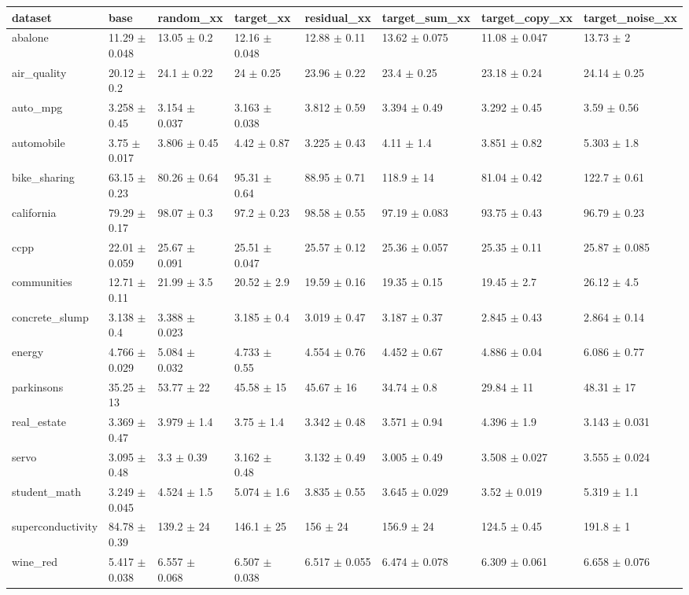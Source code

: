 \begin{tabular}{llllllll}
\toprule
dataset & base & random\_xx & target\_xx & residual\_xx & target\_sum\_xx & target\_copy\_xx & target\_noise\_xx \\
\midrule
abalone & 11.29 $\pm$ 0.048 & 13.05 $\pm$ 0.2 & 12.16 $\pm$ 0.048 & 12.88 $\pm$ 0.11 & 13.62 $\pm$ 0.075 & 11.08 $\pm$ 0.047 & 13.73 $\pm$ 2 \\
air\_quality & 20.12 $\pm$ 0.2 & 24.1 $\pm$ 0.22 & 24 $\pm$ 0.25 & 23.96 $\pm$ 0.22 & 23.4 $\pm$ 0.25 & 23.18 $\pm$ 0.24 & 24.14 $\pm$ 0.25 \\
auto\_mpg & 3.258 $\pm$ 0.45 & 3.154 $\pm$ 0.037 & 3.163 $\pm$ 0.038 & 3.812 $\pm$ 0.59 & 3.394 $\pm$ 0.49 & 3.292 $\pm$ 0.45 & 3.59 $\pm$ 0.56 \\
automobile & 3.75 $\pm$ 0.017 & 3.806 $\pm$ 0.45 & 4.42 $\pm$ 0.87 & 3.225 $\pm$ 0.43 & 4.11 $\pm$ 1.4 & 3.851 $\pm$ 0.82 & 5.303 $\pm$ 1.8 \\
bike\_sharing & 63.15 $\pm$ 0.23 & 80.26 $\pm$ 0.64 & 95.31 $\pm$ 0.64 & 88.95 $\pm$ 0.71 & 118.9 $\pm$ 14 & 81.04 $\pm$ 0.42 & 122.7 $\pm$ 0.61 \\
california & 79.29 $\pm$ 0.17 & 98.07 $\pm$ 0.3 & 97.2 $\pm$ 0.23 & 98.58 $\pm$ 0.55 & 97.19 $\pm$ 0.083 & 93.75 $\pm$ 0.43 & 96.79 $\pm$ 0.23 \\
ccpp & 22.01 $\pm$ 0.059 & 25.67 $\pm$ 0.091 & 25.51 $\pm$ 0.047 & 25.57 $\pm$ 0.12 & 25.36 $\pm$ 0.057 & 25.35 $\pm$ 0.11 & 25.87 $\pm$ 0.085 \\
communities & 12.71 $\pm$ 0.11 & 21.99 $\pm$ 3.5 & 20.52 $\pm$ 2.9 & 19.59 $\pm$ 0.16 & 19.35 $\pm$ 0.15 & 19.45 $\pm$ 2.7 & 26.12 $\pm$ 4.5 \\
concrete\_slump & 3.138 $\pm$ 0.4 & 3.388 $\pm$ 0.023 & 3.185 $\pm$ 0.4 & 3.019 $\pm$ 0.47 & 3.187 $\pm$ 0.37 & 2.845 $\pm$ 0.43 & 2.864 $\pm$ 0.14 \\
energy & 4.766 $\pm$ 0.029 & 5.084 $\pm$ 0.032 & 4.733 $\pm$ 0.55 & 4.554 $\pm$ 0.76 & 4.452 $\pm$ 0.67 & 4.886 $\pm$ 0.04 & 6.086 $\pm$ 0.77 \\
parkinsons & 35.25 $\pm$ 13 & 53.77 $\pm$ 22 & 45.58 $\pm$ 15 & 45.67 $\pm$ 16 & 34.74 $\pm$ 0.8 & 29.84 $\pm$ 11 & 48.31 $\pm$ 17 \\
real\_estate & 3.369 $\pm$ 0.47 & 3.979 $\pm$ 1.4 & 3.75 $\pm$ 1.4 & 3.342 $\pm$ 0.48 & 3.571 $\pm$ 0.94 & 4.396 $\pm$ 1.9 & 3.143 $\pm$ 0.031 \\
servo & 3.095 $\pm$ 0.48 & 3.3 $\pm$ 0.39 & 3.162 $\pm$ 0.48 & 3.132 $\pm$ 0.49 & 3.005 $\pm$ 0.49 & 3.508 $\pm$ 0.027 & 3.555 $\pm$ 0.024 \\
student\_math & 3.249 $\pm$ 0.045 & 4.524 $\pm$ 1.5 & 5.074 $\pm$ 1.6 & 3.835 $\pm$ 0.55 & 3.645 $\pm$ 0.029 & 3.52 $\pm$ 0.019 & 5.319 $\pm$ 1.1 \\
superconductivity & 84.78 $\pm$ 0.39 & 139.2 $\pm$ 24 & 146.1 $\pm$ 25 & 156 $\pm$ 24 & 156.9 $\pm$ 24 & 124.5 $\pm$ 0.45 & 191.8 $\pm$ 1 \\
wine\_red & 5.417 $\pm$ 0.038 & 6.557 $\pm$ 0.068 & 6.507 $\pm$ 0.038 & 6.517 $\pm$ 0.055 & 6.474 $\pm$ 0.078 & 6.309 $\pm$ 0.061 & 6.658 $\pm$ 0.076 \\
\bottomrule
\end{tabular}

